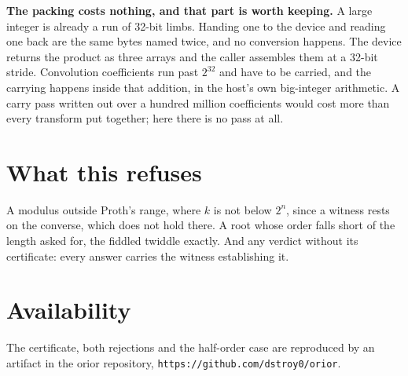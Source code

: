 \textbf{The packing costs nothing, and that part is worth keeping.} A large integer is already a run of 32-bit limbs. Handing one to the device and reading one back are the same bytes named twice, and no conversion happens. The device returns the product as three arrays and the caller assembles them at a 32-bit stride. Convolution coefficients run past \(2^{32}\) and have to be carried, and the carrying happens inside that addition, in the host's own big-integer arithmetic. A carry pass written out over a hundred million coefficients would cost more than every transform put together; here there is no pass at all.

\section{What this refuses}

A modulus outside Proth's range, where \(k\) is not below \(2^n\), since a witness rests on the converse, which does not hold there. A root whose order falls short of the length asked for, the fiddled twiddle exactly. And any verdict without its certificate: every answer carries the witness establishing it.

\section{Availability}

The certificate, both rejections and the half-order case are reproduced by an artifact in the orior repository, \texttt{https://github.com/dstroy0/orior}.
